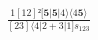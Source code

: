 \documentclass[varwidth, border=5pt]{standalone}
\begin{document}
\begin{my}
$\begin{gathered}
\scriptscriptstyle\frac{1[12]²[𝟓|𝟓|4⟩⟨4𝟓⟩}{[23]⟨4|2+3|1]s_{123}}
\end{gathered}$
\end{my}
\end{document}
